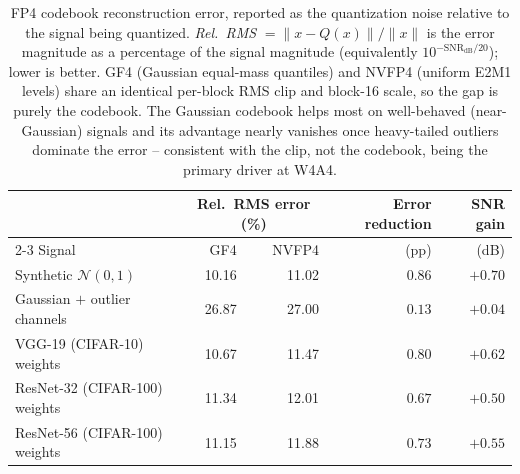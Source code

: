 \begin{table}[t]
  \centering
  \small
  \caption{FP4 codebook reconstruction error, reported as the quantization noise
    relative to the signal being quantized. \emph{Rel.\ RMS} $=\lVert x-Q(x)\rVert/
    \lVert x\rVert$ is the error magnitude as a percentage of the signal magnitude
    (equivalently $10^{-\mathrm{SNR_{dB}}/20}$); lower is better. GF4 (Gaussian
    equal-mass quantiles) and NVFP4 (uniform E2M1 levels) share an identical per-block
    RMS clip and block-16 scale, so the gap is purely the codebook. The Gaussian
    codebook helps most on well-behaved (near-Gaussian) signals and its advantage
    nearly vanishes once heavy-tailed outliers dominate the error -- consistent with
    the clip, not the codebook, being the primary driver at W4A4.}
  \label{tab:gf4-codebook-error}
  \begin{tabular}{lrrrr}
    \toprule
    & \multicolumn{2}{c}{Rel.\ RMS error (\%)} & Error reduction & SNR gain \\
    \cmidrule(lr){2-3}
    Signal & GF4 & NVFP4 & (pp) & (dB) \\
    \midrule
    Synthetic $\mathcal{N}(0,1)$      & 10.16 & 11.02 & $0.86$ & $+0.70$ \\
    Gaussian $+$ outlier channels     & 26.87 & 27.00 & $0.13$ & $+0.04$ \\
    \midrule
    VGG-19 (CIFAR-10) weights         & 10.67 & 11.47 & $0.80$ & $+0.62$ \\
    ResNet-32 (CIFAR-100) weights     & 11.34 & 12.01 & $0.67$ & $+0.50$ \\
    ResNet-56 (CIFAR-100) weights     & 11.15 & 11.88 & $0.73$ & $+0.55$ \\
    \bottomrule
  \end{tabular}
\end{table}
